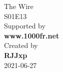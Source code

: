 \documentclass[a4paper, 12pt]{article}
\begin{document}
\begin{center}
    {\Huge\ttfamily 
        The Wire \\[20pt] S01E13}\\[50pt]
    
    {\Large\ttfamily
        Supported by \\[12pt]
        \textbf{www.1000fr.net}\\[12pt]
        Created by \\[12pt]
        \textbf{RJJxp}\\[12pt]
        2021-06-27}
\end{center}
\thispagestyle{empty}

\newpage
{}
\begin{paracol}{2}
    
\end{paracol}
\end{document}
